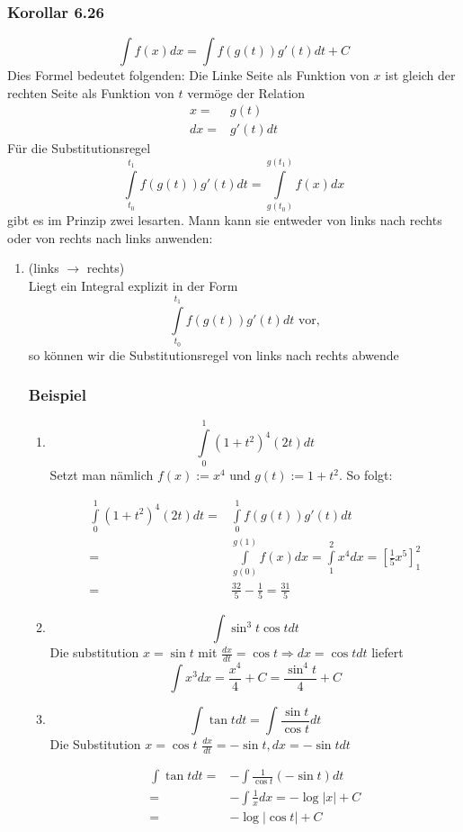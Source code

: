 \subsubsection*{Korollar 6.26}
\[\int {f(x)dx = \int {f\left( {g(t)} \right)} g'(t)dt + C} \]
Dies Formel bedeutet folgenden: Die Linke Seite als Funktion von $x$ ist gleich der rechten Seite als Funktion von $t$ vermöge der Relation
\begin{align*}
x=&g(t)\\
dx=&g'(t)dt
\end{align*}
Für die Substitutionsregel 
\[\int\limits_{{t_0}}^{{t_1}} {f\left( {g(t)} \right)g'(t)dt = \int\limits_{g({t_0})}^{g({t_1})} {f(x)dx} } \]
gibt es im Prinzip zwei lesarten.
\noindent Mann kann sie entweder von links nach rechts oder von rechts nach links anwenden: 
\begin{enumerate}
\item (links $\to$ rechts)\\
Liegt ein Integral explizit in der Form \[\int\limits_{{t_0}}^{{t_1}} {f\left( {g(t)} \right)g'(t)dt} \text{ vor,}\] so können wir die Substitutionsregel von links nach rechts abwende
\subsubsection*{Beispiel}
\begin{enumerate}
\item \[\int\limits_0^1 {{{(1 + {t^2})}^4}(2t)dt} \] Setzt man nämlich $f(x):=x^4$ und $g(t):=1+t^2$. So folgt:

\begin{align*}
\int\limits_0^1 {{{(1 + {t^2})}^4}(2t)dt}  =&\int\limits_0^1 {f\left( {g(t)} \right)g'(t)dt} \\
=&\int\limits_{g(0)}^{g(1)} {f(x)dx = } \int\limits_1^2 {{x^4}dx = \left[ {\frac{1}{5}{x^5}} \right]_1^2} \\
=&\frac{{32}}{5} - \frac{1}{5} = \frac{{31}}{5}
\end{align*}

\item \[\int {{{\sin }^3}t\cos t dt} \] Die substitution $x=\sin t$ mit $\frac{dx}{dt}=\cos t \Rightarrow dx=\cos t dt$ liefert \[\int {{x^3}dx = \frac{{{x^4}}}{4} + C = \frac{{{{\sin }^4}t}}{4}}  + C\]
\item \[\int {\tan tdt = \int {\frac{{\sin t}}{{\cos t}}dt} } \] 
Die Substitution $x=\cos t$ $\frac{dx}{dt}=-\sin t, dx=-\sin t dt$ 

\begin{align*}
\int\tan tdt =&- \int {\frac{1}{{\cos t}}( - \sin t)dt}\\
 = &- \int {\frac{1}{x}}   dx= - \log \left| x \right| + C\\
=& - \log \left| {\cos t} \right| + C
\end{align*}


\end{enumerate}
\end{enumerate}
